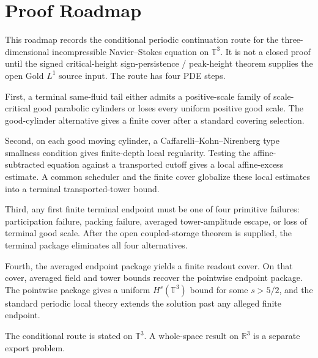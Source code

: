 \section{Proof Roadmap}

This roadmap records the conditional periodic continuation route for the three-dimensional incompressible Navier--Stokes equation on \(\mathbb T^3\).  It is not a closed proof until the signed critical-height sign-persistence / peak-height theorem supplies the open Gold \(L^1\) source input.  The route has four PDE steps.

First, a terminal same-fluid tail either admits a positive-scale family of scale-critical good parabolic cylinders or loses every uniform positive good scale.  The good-cylinder alternative gives a finite cover after a standard covering selection.

Second, on each good moving cylinder, a Caffarelli--Kohn--Nirenberg type smallness condition gives finite-depth local regularity.  Testing the affine-subtracted equation against a transported cutoff gives a local affine-excess estimate.  A common scheduler and the finite cover globalize these local estimates into a terminal transported-tower bound.

Third, any first finite terminal endpoint must be one of four primitive failures: participation failure, packing failure, averaged tower-amplitude escape, or loss of terminal good scale.  After the open coupled-storage theorem is supplied, the terminal package eliminates all four alternatives.

Fourth, the averaged endpoint package yields a finite readout cover.  On that cover, averaged field and tower bounds recover the pointwise endpoint package.  The pointwise package gives a uniform \(H^s(\mathbb T^3)\) bound for some \(s>5/2\), and the standard periodic local theory extends the solution past any alleged finite endpoint.

The conditional route is stated on \(\mathbb T^3\).  A whole-space result on \(\mathbb R^3\) is a separate export problem.
